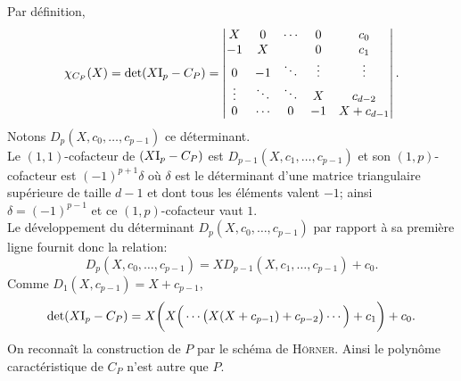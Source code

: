 
\begin{preuve}
    Par définition,
    $$
    \chi_{C_P}(X) = \det(X \mathrm{I}_p - C_P) = 
    \begin{vmatrix}
        X & 0 & \cdots & 0 & c_0 \\
        -1 & X & & 0 & c_1 \\
        0 & -1 & \ddots & \vdots & \vdots \\
        \vdots & \ddots & \ddots & X & c_{d-2} \\
        0 & \cdots & 0 & -1 & X + c_{d-1}
    \end{vmatrix}.
    $$
    Notons $D_p(X, c_0, \dots, c_{p-1})$ ce déterminant. \\
    Le $(1,1)$-cofacteur de $(X \mathrm{I}_p - C_P)$ est $D_{p-1}(X, c_1, \dots, c_{p-1})$ et son $(1,p)$-cofacteur est $(-1)^{p+1} \delta$ où $\delta$ est le déterminant d'une matrice triangulaire supérieure de taille $d-1$ et dont tous les éléments valent $-1$; ainsi $\delta = (-1)^{p-1}$ et ce $(1,p)$-cofacteur vaut $1$. \\
    Le développement du déterminant $D_p(X, c_0, \dots, c_{p-1})$ par rapport à sa première ligne fournit donc la relation:
    $$D_p(X, c_0, \dots, c_{p-1}) = X D_{p-1}(X, c_1, \dots, c_{p-1}) + c_0.$$
    Comme $D_1(X, c_{p-1}) = X + c_{p-1}$,
    $$\det(X \mathrm{I}_p - C_P) = X \bigg(X \Big(\cdots \big(X(X+c_{p-1}) + c_{p-2} \big) \cdots \Big) + c_1 \bigg) + c_0.$$
    On reconnaît la construction de $P$ par le schéma de \textsc{Hörner}. Ainsi le polynôme caractéristique de $C_P$ n'est autre que $P$. 
\end{preuve} 

